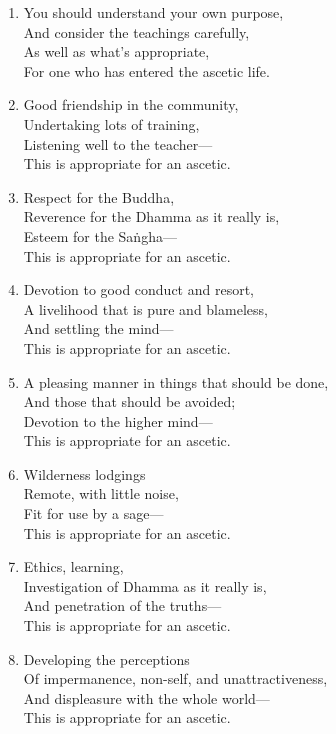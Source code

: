 \documentclass[10pt, openany]{book}
\begin{document}
\begin{enumerate}
\item You should understand your own purpose,\\
And consider the teachings carefully,\\
As well as what’s appropriate,\\
For one who has entered the ascetic life.

\item Good friendship in the community,\\
Undertaking lots of training,\\
Listening well to the teacher—\\
This is appropriate for an ascetic.

\item Respect for the Buddha,\\
Reverence for the Dhamma as it really is,\\
Esteem for the Saṅgha—\\
This is appropriate for an ascetic.

\item Devotion to good conduct and resort,\\
A livelihood that is pure and blameless,\\
And settling the mind—\\
This is appropriate for an ascetic.

\item A pleasing manner in things that should be done,\\
And those that should be avoided;\\
Devotion to the higher mind—\\
This is appropriate for an ascetic.

\item Wilderness lodgings\\
Remote, with little noise,\\
Fit for use by a sage—\\
This is appropriate for an ascetic.

\item Ethics, learning,\\
Investigation of Dhamma as it really is,\\
And penetration of the truths—\\
This is appropriate for an ascetic.

\item Developing the perceptions\\
Of impermanence, non-self, and unattractiveness,\\
And displeasure with the whole world—\\
This is appropriate for an ascetic.


\end{enumerate}
\end{document}
